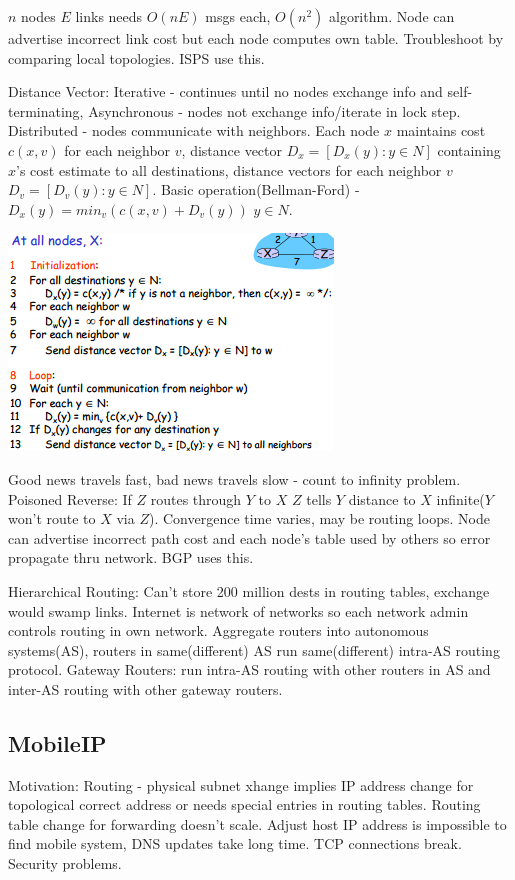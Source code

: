 \documentclass[8pt]{extarticle}
\begin{document}
\begin{multicols}{2}
$n$ nodes $E$ links needs $O(nE)$ msgs each, $O(n^2)$ algorithm. Node can advertise incorrect link cost but each node computes own table. Troubleshoot by comparing local topologies. ISPS use this.

Distance Vector: Iterative - continues until no nodes exchange info and self-terminating, Asynchronous - nodes not exchange info/iterate in lock step. Distributed - nodes communicate with neighbors. Each node $x$ maintains cost $c(x,v)$ for each neighbor $v$, distance vector $D_x =[D_x(y): y\in{N}]$ containing $x$’s cost estimate to all destinations, distance vectors for each neighbor $v$ $D_v = [D_v(y): y\in{N}]$. Basic operation(Bellman-Ford) - $D_x(y) = min_v{(c(x,v)+D_v(y))}$ $y\in{N}$. 

\includegraphics{distancevector.png}

Good news travels fast, bad news travels slow - count to infinity problem. Poisoned Reverse: If $Z$ routes through $Y$ to $X$ $Z$ tells $Y$ distance to $X$ infinite($Y$ won’t route to $X$ via $Z$). Convergence time varies, may be routing loops. Node can advertise incorrect path cost and each node’s table used by others so error propagate thru network. BGP uses this.

Hierarchical Routing: Can’t store 200 million dests in routing tables, exchange would swamp links. Internet is network of networks so each network admin controls routing in own network. Aggregate routers into autonomous systems(AS), routers in same(different) AS run same(different) intra-AS routing protocol. Gateway Routers: run intra-AS routing with other
routers in AS and inter-AS routing with other gateway routers.

\subsection{MobileIP}

Motivation: Routing -  physical subnet xhange implies IP address change for topological correct address or needs special entries in routing tables. Routing table change for forwarding  doesn't scale. Adjust host IP address is impossible to find mobile system, DNS updates take long time. TCP connections break. Security problems.


\end{multicols}
\end{document}
